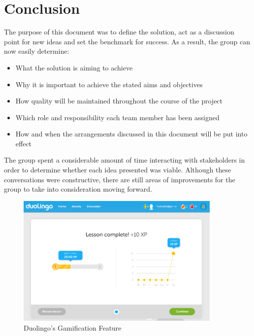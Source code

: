 \section{Conclusion}

The purpose of this document was to define the solution, act as a discussion point for new ideas and set the benchmark for success. As a result, the group can now easily determine:

\begin{itemize}
  \item What the solution is aiming to achieve
  \item Why it is important to achieve the stated aims and objectives
  \item How quality will be maintained throughout the course of the project
  \item Which role and responsibility each team member has been assigned
  \item How and when the arrangements discussed in this document will be put into effect
\end{itemize}

The group spent a considerable amount of time interacting with stakeholders in order to determine whether each idea presented was viable. Although these conversations were constructive, there are still areas of improvements for the group to take into consideration moving forward. 

\begin{figure}
  \centering
  \begin{minipage}{10cm}
    \centering
    \includegraphics[width=10cm]{inc/duolingo_gamification.jpg}
    \caption{Duolingo's Gamification Feature}
    \label{fig:duolingo_gamification}
  \end{minipage}
\end{figure}

